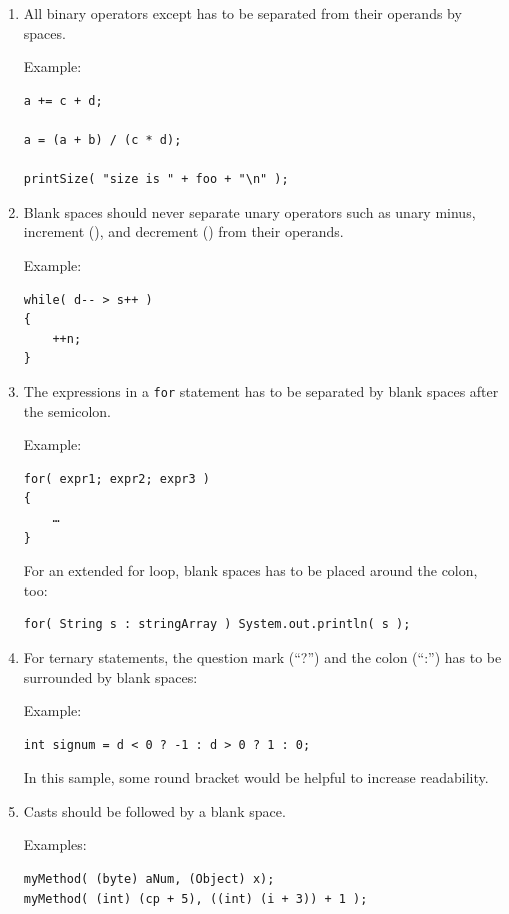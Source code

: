 \begin{enumerate}[label=P\arabic*.]
{
Examples:
\begin{lstlisting}
Map<String,String> map1 = new HashMap<String,String>();

// using the diamond operator:
Map<String,String> map2 = new HashMap<>(); 

map.put( key, value );
\end{lstlisting}}

\item{All binary operators except  has to be separated from their operands by spaces.

Example:
\begin{lstlisting}
a += c + d;

a = (a + b) / (c * d);

printSize( "size is " + foo + "\n" );
\end{lstlisting}}

\item{Blank spaces should never separate unary operators such as unary minus, increment (\bdq{\lstinline|++|}), and decrement (\bdq{\lstinline|--|}) from their operands.

Example:
\begin{lstlisting}
while( d-- > s++ )
{
    ++n;
}
\end{lstlisting}}

\item{The expressions in a \lstinline|for| statement has to be separated by blank spaces after the semicolon.

Example:
\begin{lstlisting}
for( expr1; expr2; expr3 )
{
    …
}
\end{lstlisting}

For an extended for loop, blank spaces has to be placed around the colon, too:
\begin{lstlisting}
for( String s : stringArray ) System.out.println( s );
\end{lstlisting}}

\item{For ternary statements, the question mark (“?”) and the colon (“:”) has to be surrounded by blank spaces:

Example:
\begin{lstlisting}
int signum = d < 0 ? -1 : d > 0 ? 1 : 0;
\end{lstlisting}

In this sample, some round bracket would be helpful to increase readability.}
\item{Casts should be followed by a blank space. 

Examples:
\begin{lstlisting}
myMethod( (byte) aNum, (Object) x);
myMethod( (int) (cp + 5), ((int) (i + 3)) + 1 );
\end{lstlisting}}
\end{enumerate}


